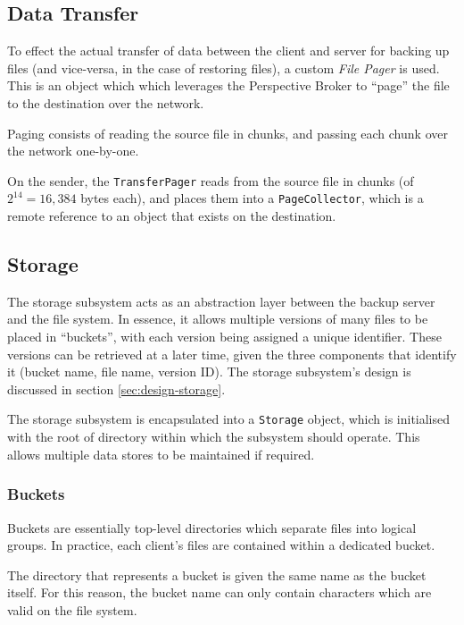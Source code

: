 \subsection{Data Transfer}
\label{sec:implementation-server-transfer}

To effect the actual transfer of data between the client and server for backing
up files (and vice-versa, in the case of restoring files), a custom \emph{File
Pager} is used. This is an object which which leverages the Perspective Broker
to ``page'' the file to the destination over the network.

Paging consists of reading the source file in chunks, and passing each chunk
over the network one-by-one.

On the sender, the \verb!TransferPager! reads from the source file in chunks
(of $2^{14} = 16,384$ bytes each), and places them into a \verb!PageCollector!,
which is a remote reference to an object that exists on the destination.

\subsection{Storage}
\label{sec:implementation-server-storage}

The storage subsystem acts as an abstraction layer between the backup server
and the file system. In essence, it allows multiple versions of many files to
be placed in ``buckets'', with each version being assigned a unique identifier.
These versions can be retrieved at a later time, given the three components
that identify it (bucket name, file name, version ID). The storage subsystem's
design is discussed in section \ref{sec:design-storage}.

The storage subsystem is encapsulated into a \verb!Storage! object, which is
initialised with the root of directory within which the subsystem should
operate. This allows multiple data stores to be maintained if required.

\subsubsection{Buckets}
\label{sec:implementation-server-storage-buckets}

Buckets are essentially top-level directories which separate files into logical
groups. In practice, each client's files are contained within a dedicated
bucket.

The directory that represents a bucket is given the same name as the bucket
itself. For this reason, the bucket name can only contain characters which are
valid on the file system.


